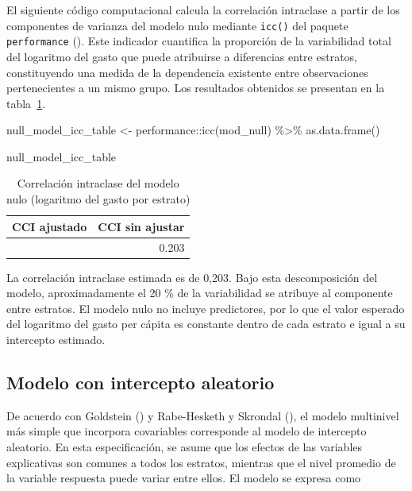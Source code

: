 \documentclass[
  spanish,
  11pt,
  letterpaper,
  oneside,
  open=any]{scrbook}
\newenvironment{Shaded}{\begin{snugshade}}{\end{snugshade}}
\newcommand{\FunctionTok}[1]{\textcolor[rgb]{0.28,0.35,0.67}{#1}}
\newcommand{\NormalTok}[1]{\textcolor[rgb]{0.00,0.23,0.31}{#1}}
\newcommand{\OtherTok}[1]{\textcolor[rgb]{0.00,0.23,0.31}{#1}}
\newcommand{\SpecialCharTok}[1]{\textcolor[rgb]{0.37,0.37,0.37}{#1}}
\begin{document}
El siguiente código computacional calcula la correlación intraclase a
partir de los componentes de varianza del modelo nulo mediante
\texttt{icc()} del paquete \texttt{performance}
(). Este indicador
cuantifica la proporción de la variabilidad total del logaritmo del
gasto que puede atribuirse a diferencias entre estratos, constituyendo
una medida de la dependencia existente entre observaciones
pertenecientes a un mismo grupo. Los resultados obtenidos se presentan
en la tabla~\ref{tbl-icc-nulo}.

\begin{Shaded}
\begin{Highlighting}[]
\NormalTok{null\_model\_icc\_table }\OtherTok{\textless{}{-}}\NormalTok{ performance}\SpecialCharTok{::}\FunctionTok{icc}\NormalTok{(mod\_null) }\SpecialCharTok{\%\textgreater{}\%}
  \FunctionTok{as.data.frame}\NormalTok{()}

\NormalTok{null\_model\_icc\_table}
\end{Highlighting}
\end{Shaded}

{

\begin{longtable}[]{@{}rr@{}}

\caption{\label{tbl-icc-nulo}Correlación intraclase del modelo nulo
(logaritmo del gasto por estrato)}

\tabularnewline

\toprule\noalign{}
CCI ajustado & CCI sin ajustar \\
\midrule\noalign{}
\endhead
\bottomrule\noalign{}
\endlastfoot
0.203 & 0.203 \\

\end{longtable}

}

La correlación intraclase estimada es de 0,203. Bajo esta descomposición
del modelo, aproximadamente el 20 \% de la variabilidad se atribuye al
componente entre estratos. El modelo nulo no incluye predictores, por lo
que el valor esperado del logaritmo del gasto per cápita es constante
dentro de cada estrato e igual a su intercepto estimado.

\subsection{Modelo con intercepto
aleatorio}\label{sec-intercepto-aleatorio}

De acuerdo con Goldstein ()
y Rabe-Hesketh y Skrondal
(), el modelo multinivel
más simple que incorpora covariables corresponde al modelo de intercepto
aleatorio. En esta especificación, se asume que los efectos de las
variables explicativas son comunes a todos los estratos, mientras que el
nivel promedio de la variable respuesta puede variar entre ellos. El
modelo se expresa como
\end{document}
